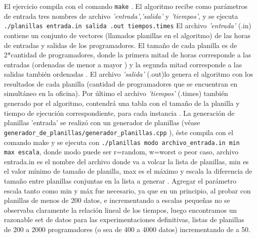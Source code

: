 El ejercicio compila con el comando \texttt{make} .
\newline
El algoritmo recibe como parámetros de entrada tres nombres de archivo \emph{'entrada'},\emph{'salida'} y \emph{'tiempos'}, y se ejecuta \texttt{./planillas entrada.in salida .out tiempos.times}
\newline
El archivo \emph{'entrada'} (.in) contiene un conjunto de vectores (llamados planillas en el algoritmo) de las horas de  entradas y salidas de los programadores.
\newline
El tamaño de cada planilla es de  2*cantidad de programadores, donde la primera mitad de horas corresponde a las entradas (ordenadas de menor a mayor ) y la segunda mitad corresponde a las salidas también ordenadas .
\newline
El archivo \emph{'salida'} (.out)lo genera el algoritmo con los resultados de cada planilla  (cantidad de programadores que se encuentran en simultáneo en la oficina).
\newline
Por último el archivo \emph{'tiempos'} (.times)  también generado por el algoritmo, contendrá una tabla con el tamaño de la planilla y tiempo de ejecución correspondiente, para cada instancia .
\newline
La generación de planillas 'entrada' se realizó con un generador de planillas (véase \texttt{generador\_de\_planillas/generador\_planillas.cpp} ), éste compila con el comando make y se ejecuta con 
\texttt{./planillas modo archivo\_entrada.in  min max escala}, donde modo puede ser r=random, w=worst o peor caso, archivo entrada.in es el nombre del archivo donde va a volcar la lista de planillas, min es el valor mínimo de tamaño de planilla, max es el máximo y escala la diferencia de tamaño entre planillas conjuntas en la lista a generar .
\newline
Agregar el parámetro escala tanto como min y máx fue necesario, ya que en un principio, al probar con planillas de menos de 200 datos, e incrementando a escalas pequeñas no se observaba claramente la relación lineal de los tiempos, luego encontramos un razonable set de datos para las experimentaciones definitivas, listas de planillas de 200 a 2000 programadores (o sea de 400 a 4000 datos) incrementando de a 50.  
